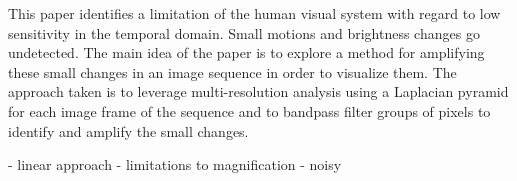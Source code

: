 \documentclass{article}
\begin{document}
This paper identifies a limitation of the human visual system with regard to low sensitivity in the temporal domain.  Small motions and brightness changes go undetected.  The main idea of the paper is to explore a method for amplifying these small changes in an image sequence in order to visualize them.  The approach taken is to leverage multi-resolution analysis using a Laplacian pyramid for each image frame of the sequence and to bandpass filter groups of pixels to identify and amplify the small changes.

- linear approach
- limitations to magnification
- noisy
\end{document}
